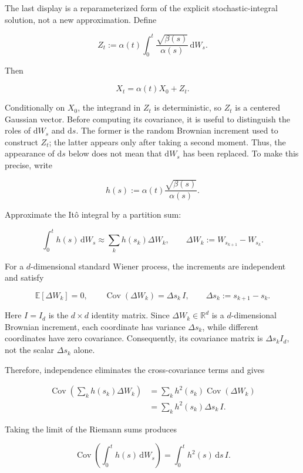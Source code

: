 \documentclass[11pt,a4paper]{article}
\theoremstyle{definition}
\begin{document}
\begin{note}
The last display is a reparameterized form of the explicit stochastic-integral solution,
not a new approximation. Define

\[
Z_t
:=
\alpha(t)\int_0^t
\frac{\sqrt{\beta(s)}}{\alpha(s)}\,\mathrm{d}W_s.
\]

Then

\[
X_t=\alpha(t)X_0+Z_t.
\]

Conditionally on $X_0$, the integrand in $Z_t$ is deterministic, so $Z_t$ is a centered
Gaussian vector. Before computing its covariance, it is useful to distinguish the roles
of $\mathrm{d}W_s$ and $\mathrm{d}s$. The former is the random Brownian increment used to
construct $Z_t$; the latter appears only after taking a second moment. Thus, the
appearance of $\mathrm{d}s$ below does not mean that $\mathrm{d}W_s$ has been replaced.
To make this precise, write

\[
h(s):=\alpha(t)\frac{\sqrt{\beta(s)}}{\alpha(s)}.
\]

Approximate the It\^o integral by a partition sum:

\[
\int_0^t h(s)\,\mathrm{d}W_s
\approx
\sum_k h(s_k)\Delta W_k,
\qquad
\Delta W_k:=W_{s_{k+1}}-W_{s_k}.
\]

For a $d$-dimensional standard Wiener process, the increments are independent and satisfy

\[
\mathbb{E}[\Delta W_k]=0,
\qquad
\operatorname{Cov}(\Delta W_k)=\Delta s_k\,I,
\qquad
\Delta s_k:=s_{k+1}-s_k.
\]

Here $I=I_d$ is the $d\times d$ identity matrix. Since
$\Delta W_k\in\mathbb{R}^d$ is a $d$-dimensional Brownian increment, each coordinate has
variance $\Delta s_k$, while different coordinates have zero covariance. Consequently,
its covariance matrix is $\Delta s_k I_d$, not the scalar $\Delta s_k$ alone.

Therefore, independence eliminates the cross-covariance terms and gives

\[
\begin{aligned}
\operatorname{Cov}\left(\sum_k h(s_k)\Delta W_k\right)
&=
\sum_k h^2(s_k)\operatorname{Cov}(\Delta W_k) \\
&=
\sum_k h^2(s_k)\Delta s_k\,I.
\end{aligned}
\]

Taking the limit of the Riemann sums produces

\[
\operatorname{Cov}\left(\int_0^t h(s)\,\mathrm{d}W_s\right)
=
\int_0^t h^2(s)\,\mathrm{d}s\,I.
\]


\end{note}
\end{document}
